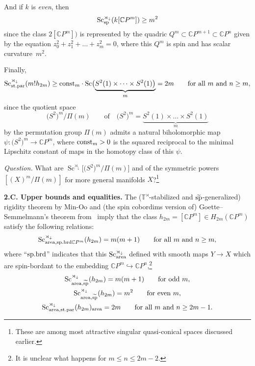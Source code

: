 \documentclass[pdftex]{sigma}
\numberwithin{equation}{section}
\begin{document}
And if $k$ is {\it even}, then
\[
\operatorname{Sc}_{\rm sp}^{\rtimes_\downarrow}(k[\mathbb CP^m])\geq m^2
\]
since the class
$2[\mathbb CP^m])$ is represented by the
 quadric $Q^m\subset \mathbb CP^{m+1}\subset \mathbb CP^n$ given by the equation $z_0^2+z_1^2+\dots +z_m^2=0$,
 where this
$Q^m$ is spin and has scalar curvature~$m^2$.

Finally,
\[
\operatorname{Sc}_{\rm st.par}^{\rtimes_\downarrow}(m!h_{2m}) \geq {\rm const}_m \cdot \operatorname{Sc}\bigl(\underset {m} {\underbrace { S^2(1)\times \dots \times S^2(1)\bigr)}}=2m
\qquad \mbox{for all $m$ and $n\geq m$},
\]
since the quotient space
\[
\bigl(S^2\bigr)^m/\Pi(m) \qquad \text{of} \quad \bigl(S^2\bigr)^m=\underset {m} {\underbrace { S^2(1)\times \dots \times S^2(1)}}
\]
 by the permutation group $\Pi(m)$ admits a natural biholomorphic map $\psi\colon \bigl(S^2\bigr)^m\to \mathbb CP^m$,
 where ${\rm const}_m>0$ is the squared reciprocal to the minimal Lipschitz constant of
 maps in the homotopy class of this $\psi$.

 {\it Question.} What are $\operatorname{Sc}^{\rtimes_\downarrow}\bigl[\bigl(S^2\bigr)^m/\Pi(m)\bigr]$
 and of the symmetric powers $[(X)^m/\Pi(m)]$ for more general manifolds $X$?\footnote{These are among most attractive singular quasi-conical spaces discussed earlier.}

\textbf{2.C. Upper bounds and equalities.} The ($\mathbb T^\rtimes$-stabilized and $\widetilde{\rm sp}$-generalized) rigidity theorem by
Min-Oo \cite{Mi1995} and (the spin cobordims version of) Goette--Semmelmann's theorem from~\cite{GS1999} imply that the
class $h_{2m} =[\mathbb CP^m]\in H_{2m}(\mathbb CP^m)$ satisfy the following relations:
\begin{gather*}
\operatorname{Sc}_{{\rm area,sp.brd}\mathbb C P^m}^{\rtimes_\downarrow} (h_{2m})= m(m+1) \qquad \text{for all $m$ and $n\geq m$}, %
\end{gather*}
 where ``${\rm sp.brd}$'' indicates that this $\operatorname{Sc}_{\rm area}^{\rtimes_\downarrow}$ defined with smooth maps $Y\to X$ which are spin-bordant to the embedding $\mathbb CP^{m}\hookrightarrow \mathbb CP^{n}$,\footnote{It is unclear what happens for $m \leq n\leq 2m-2$.}
\begin{gather*}
\operatorname{Sc}_{{\rm area},\widetilde{\rm sp}}^{\rtimes_\downarrow} (h_{2m})= m(m+1) \qquad \text{for odd $m$},  %
\\
\operatorname{Sc}^{\rtimes_\downarrow} _{{\rm area},\widetilde {\rm sp}}(h_{2m})=m^2 \qquad \text{for even $m$}, %
\\
\operatorname{Sc}^{\rtimes_\downarrow} _{{\rm area,st.par}}(h_{2m})_{\rm area} =2m \qquad \text{for all $m$ and $n\geq 2m-1$}. %
\end{gather*}
\end{document}
